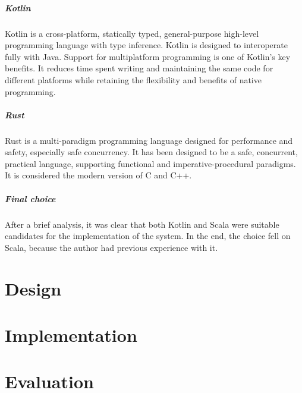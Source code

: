 \documentclass[12pt,a4paper,openright,twoside]{book}
\begin{document}
\paragraph*{Kotlin}
Kotlin is a cross-platform, statically typed, general-purpose high-level programming language with type inference. 
Kotlin is designed to interoperate fully with Java.
Support for multiplatform programming is one of Kotlin’s key benefits. It reduces time spent writing and maintaining 
the same code for different platforms while retaining the flexibility and benefits of native programming.

\paragraph*{Rust}
Rust is a multi-paradigm programming language designed for performance and safety, especially safe concurrency.
It has been designed to be a safe, concurrent, practical language, supporting functional and imperative-procedural paradigms.
It is considered the modern version of C and C++.

\paragraph*{Final choice}
After a brief analysis, it was clear that both Kotlin and Scala were suitable candidates for the implementation of the system.
In the end, the choice fell on Scala, because the author had previous experience with it.

\chapter{Design}

\chapter{Implementation}

\chapter{Evaluation}
\end{document}
